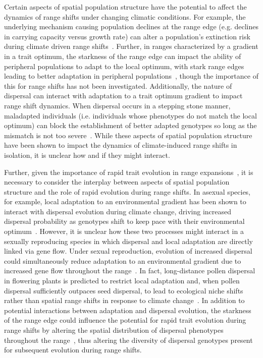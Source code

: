 \documentclass[11pt]{article}
\begin{document}
Certain aspects of spatial population structure have the potential to affect the dynamics of range shifts under changing climatic conditions. For example, the underlying mechanism causing population declines at the range edge (e.g. declines in carrying capacity versus growth rate) can alter a population's extinction risk during climate driven range shifts~\citep{henry2013eco}. Further, in ranges characterized by a gradient in a trait optimum, the starkness of the range edge can impact the ability of peripheral populations to adapt to the local optimum, with stark range edges leading to better adaptation in peripheral populations~\citep{garcia1997genetic}, though the importance of this for range shifts has not been investigated. Additionally, the nature of dispersal can interact with adaptation to a trait optimum gradient to impact range shift dynamics. When dispersal occurs in a stepping stone manner, maladapted individuals (i.e. individuals whose phenotypes do not match the local optimum) can block the establishment of better adapted genotypes so long as the mismatch is not too severe~\citep{atkins2010local}. While these aspects of spatial population structure have been shown to impact the dynamics of climate-induced range shifts in isolation, it is unclear how and if they might interact. 

Further, given the importance of rapid trait evolution in range expansions~\citep{weiss2017rapid, ochocki2017rapid, szHucs2017rapid, shaw2015dispersal, phillips2015evolutionary}, it is necessary to consider the interplay between aspects of spatial population structure and the role of rapid evolution during range shifts. In asexual species, for example, local adaptation to an environmental gradient has been shown to interact with dispersal evolution during climate change, driving increased dispersal probability as genotypes shift to keep pace with their environmental optimum~\citep{hargreaves2015fitness}. However, it is unclear how these two processes might interact in a sexually reproducing species in which dispersal and local adaptation are directly linked via gene flow. Under sexual reproduction, evolution of increased dispersal could simultaneously reduce adaptation to an environmental gradient due to increased gene flow throughout the range~\citep{garcia1997genetic, kirkpatrick1997evolution}. In fact, long-distance pollen dispersal in flowering plants is predicted to restrict local adaptation and, when pollen dispersal sufficiently outpaces seed dispersal, to lead to ecological niche shifts rather than spatial range shifts in response to climate change~\citep{aguilee2016pollen}. In addition to potential interactions between adaptation and dispersal evolution, the starkness of the range edge could influence the potential for rapid trait evolution during range shifts by altering the spatial distribution of dispersal phenotypes throughout the range~\citep{henry2013eco, hargreaves2014evolution}, thus altering the diversity of dispersal genotypes present for subsequent evolution during range shifts.
\end{document}
